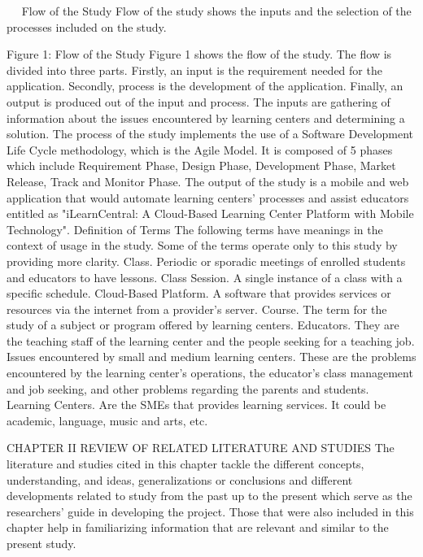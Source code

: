  
Flow of the Study
	Flow of the study shows the inputs and the selection of the processes included on the study.















Figure 1: Flow of the Study
Figure 1 shows the flow of the study. The flow is divided into three parts. Firstly, an input is the requirement needed for the application. Secondly, process is the development of the application. Finally, an output is produced out of the input and process.
The inputs are gathering of information about the issues encountered by learning centers and determining a solution. 
The process of the study implements the use of a Software Development Life Cycle methodology, which is the Agile Model. It is composed of 5 phases which include Requirement Phase, Design Phase, Development Phase, Market Release, Track and Monitor Phase.
	The output of the study is a mobile and web application that would automate learning centers’ processes and assist educators entitled as "iLearnCentral: A Cloud-Based Learning Center Platform with Mobile Technology".
Definition of Terms
The following terms have meanings in the context of usage in the study. Some of the terms operate only to this study by providing more clarity. 
Class. Periodic or sporadic meetings of enrolled students and educators to have lessons.
Class Session. A single instance of a class with a specific schedule.
Cloud-Based Platform. A software that provides services or resources via the internet from a provider’s server.
Course. The term for the study of a subject or program offered by learning centers. 
	Educators. They are the teaching staff of the learning center and the people seeking for a teaching job. 
Issues encountered by small and medium learning centers. These are the problems encountered by the learning center’s operations, the educator’s class management and job seeking, and other problems regarding the parents and students.
	Learning Centers. Are the SMEs that provides learning services. It could be academic, language, music and arts, etc. 
 
CHAPTER II
REVIEW OF RELATED LITERATURE AND STUDIES
	The literature and studies cited in this chapter tackle the different concepts, understanding, and ideas, generalizations or conclusions and different developments related to study from the past up to the present which serve as the researchers’ guide in developing the project. Those that were also included in this chapter help in familiarizing information that are relevant and similar to the present study.

